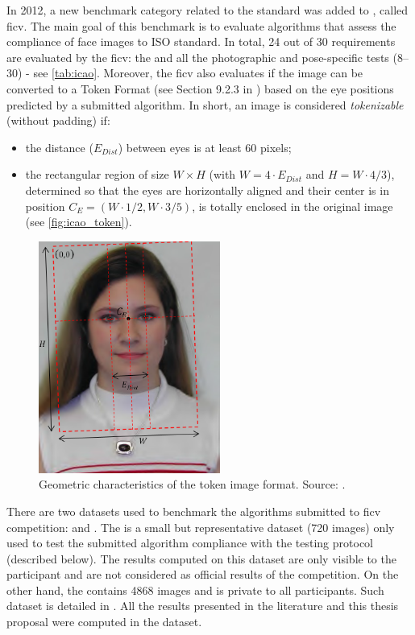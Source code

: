 In 2012, a new benchmark category related to the \icao standard was added to \fvcongoing \citep{ferrara2012face}, called \acf{ficv}. The main goal of this benchmark is to evaluate algorithms that assess the compliance of face images to ISO standard. In total, 24 out of 30 requirements are evaluated by the \acs{ficv}: the \eyecenterlocation and all the photographic and pose-specific tests (8--30) - see \autoref{tab:icao}. Moreover, the \acs{ficv} also evaluates if the image can be converted to a Token Format (see Section 9.2.3 in \citep{iso-iec}) based on the eye positions predicted by a submitted algorithm. In short, an image is considered \textit{tokenizable} (without padding) if:

\begin{itemize}
\item the distance ($E_{Dist}$) between eyes is at least 60 pixels;
\item the rectangular region of size $W \times H$ (with $W=4\cdot E_{Dist}$ and $H=W \cdot 4/3$), determined so that the eyes are horizontally aligned and their center is in position $C_E=(W\cdot1/2,W\cdot3/5)$, is totally enclosed in the original image (see \autoref{fig:icao_token}).
\end{itemize}

\begin{figure}[tb]
    \centering
    \includegraphics[height=3.0in]{images/dataset/icao_tokenizable.png}
    \caption{Geometric characteristics of the token image format. Source: \citep{fvcongoing}.}
    \label{fig:icao_token}
\end{figure}

There are two datasets used to benchmark the algorithms submitted to \acs{ficv} competition: \ficvtest and \ficvofficial. The \ficvtest is a small but representative dataset (720 images) only used to test the submitted algorithm compliance with the testing protocol (described below). The results computed on this dataset are only visible to the participant and are not considered as official results of the competition. On the other hand, the \ficvofficial contains 4868 images and is private to all participants. Such dataset is detailed in \cite{ferrara2012face}. All the results presented in the literature and this thesis proposal were computed in the \ficvofficial dataset.

